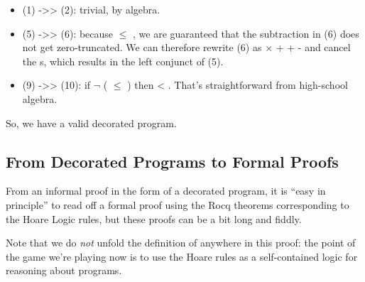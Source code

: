 \documentclass[12pt]{report}
\begin{document}
\begin{itemize}
\item  (1) ->> (2):  trivial, by algebra.

\item  (5) ->> (6):  because  \ensuremath{\le} , we are guaranteed that the
        subtraction in (6) does not get zero-truncated.  We can
        therefore rewrite (6) as  \ensuremath{\times}  +  +  -  and cancel the
        s, which results in the left conjunct of (5).

\item  (9) ->> (10):  if \ensuremath{\lnot} ( \ensuremath{\le} ) then  < .  That's
        straightforward from high-school algebra.

\end{itemize}
    So, we have a valid decorated program. 
\begin{coqdoccode}
\coqdocemptyline
\end{coqdoccode}
\subsection{From Decorated Programs to Formal Proofs}



 From an informal proof in the form of a decorated program, it is
    ``easy in principle'' to read off a formal proof using the Rocq
    theorems corresponding to the Hoare Logic rules, but these proofs
    can be a bit long and fiddly. 

 Note that we do \textit{not} unfold the definition of 
    anywhere in this proof: the point of the game we're playing now
    is to use the Hoare rules as a self-contained logic for reasoning
    about programs. 
\end{document}
